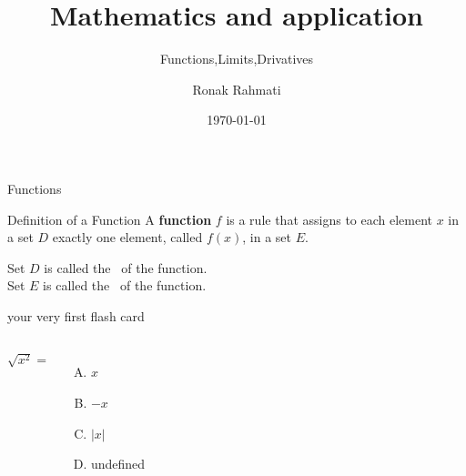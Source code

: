 \documentclass{beamer}
\title[Calculus]{Mathematics and application}
\subtitle{Functions,Limits,Drivatives}
\author{Ronak Rahmati}
\institute{Czech university of life science}
\date{\today}
\begin{document}
\begin{frame}
   \titlepage 
\end{frame}



\begin{frame}[t]{Functions} \vspace{4pt}
\begin{block}{Definition of a Function}
\vspace{0.5em}
A \textbf{function} $f$ is a rule that assigns to each element $x$ in a set $D$ exactly one element, called $f(x)$, in a set $E$.
\vspace{0.5em}
\end{block}

\vspace{10pt}
Set $D$ is called the
\, of the function.\\[10pt]

Set $E$ is called the
\, of the function.
\end{frame}



\begin{frame}[t]{your very first flash card}\vspace{10pt}
 \begin{columns}[onlytextwidth]
 $\sqrt{x^2}=$ \\[10pt]
   \begin{enumerate}[(A)]
       \item $x$
       \item $-x$
       \item $|x|$
       \item undefined
   \end{enumerate}
\end{columns}
\end{frame}
\end{document}
